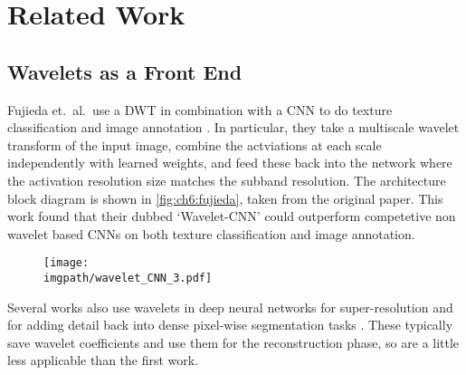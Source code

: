 \section{Related Work}\label{sec:ch6:related} 
\subsection{Wavelets as a Front End}
Fujieda et.\ al.\ use a DWT in combination with a
CNN to do texture classification and image annotation 
\cite{fujieda_wavelet_2017, fujieda_wavelet_2018}. In particular, they take a
multiscale wavelet transform of the input image, combine the actviations at each
scale independently with learned weights, and feed these back into the network
where the activation resolution size matches the subband resolution. The
architecture block diagram is shown in \autoref{fig:ch6:fujieda}, taken from the
original paper.  This work found that their dubbed `Wavelet-CNN' could
outperform competetive non wavelet based CNNs on both texture classification and
image annotation.

\begin{figure}[bt]
  \centering
  \texttt{[image: \\imgpath/wavelet\_CNN\_3.pdf]}
  \label{fig:ch6:fujieda}
\end{figure}

Several works also use wavelets in deep neural networks for super-resolution
\cite{guo_deep_2017} and for adding detail back into dense pixel-wise
segmentation tasks \cite{ma_detailed_2018}. These typically save wavelet
coefficients and use them for the reconstruction phase, so are a little less
applicable than the first work.

